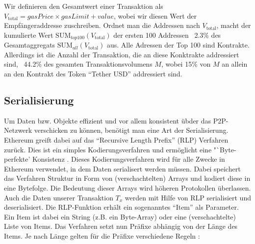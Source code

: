 \documentclass[runningheads]{llncs}
\begin{document}
Wir definieren den Gesamtwert einer Transaktion als $ V_{\text{total}} = \textit{gasPrice} \times \textit{gasLimit} + \textit{value} $, wobei wir diesen Wert der Empfängeraddresse zuschreiben. Ordnet man die Addressen nach $ V_{\text{total}} $, macht der kumulierte Wert $ \text{SUM}_{top100}(V_{\text{total}}) $ der ersten 100 Addressen ~2.3\% des Gesamtaggregats $ \text{SUM}_{all}(V_{\text{total}}) $ aus. Alle Adressen der Top 100 sind Kontrakte. Allerdings ist die Anzahl der Transaktion, die an diese Konktrakte addressiert sind, ~44.2\% des gesamten Transaktionsvolumens $ M $, wobei 15\% von $ M $ an allein an den Kontrakt des Token "`Tether USD"' addressiert sind. \cite{neemann_appendix_nodate}

\subsection{Serialisierung}
Um Daten bzw. Objekte effizient und vor allem konsistent übder das P2P-Netzwerk verschicken zu können, benötigt man eine Art der Serialisierung. Ethereum greift dabei auf das "`Recursive Length Prefix"' (RLP) Verfahren zurück. Dies ist ein simples Kodierungsverfahren und ermöglicht eine "`Byte-perfekte' Konsistenz \cite{noauthor_ethereumwiki_nodate}.
Dieses Kodierungsverfahren wird für alle Zwecke in Ethereum verwendet, in dem Daten serialisert werden müssen. Dabei speichert das Verfahren Struktur in Form von (verschachtelten) Arrays und kodiert diese in eine Bytefolge. Die Bedeutung dieser Arrays wird höheren Protokollen überlassen. \cite{noauthor_ethereumwiki_nodate}
Auch die Daten unserer Transaktion $T_x$ werden mit Hilfe von RLP serialisiert und deserialisiert.
Die RLP-Funktion erhält ein sogenanntes "`Item"' als Parameter. Ein Item ist dabei ein String (z.B. ein Byte-Array) oder eine (verschachtelte) Liste von Items. Das Verfahren setzt nun Präfixe abhängig von der Länge des Items. Je nach Länge gelten für die Präfixe verschiedene Regeln \cite{noauthor_ethereum/wiki/rlp_nodate}:
\end{document}
